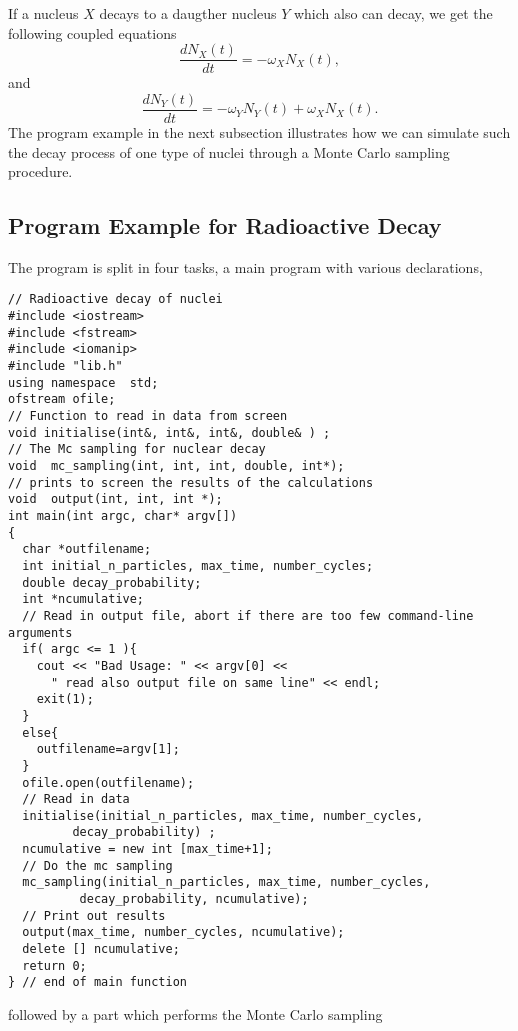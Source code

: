 If a nucleus $X$ decays to a daugther nucleus $Y$ which also can decay, we get
the following coupled equations
\[
   \frac{dN_X(t)}{dt}=-\omega_XN_X(t),
\]
and
\[
   \frac{dN_Y(t)}{dt}=-\omega_YN_Y(t)+\omega_XN_X(t).
\]
The program example in the next subsection illustrates how
we can simulate such the  decay process of one type of nuclei through a Monte Carlo 
sampling procedure.

\subsection{Program Example for Radioactive Decay}
The program is split in four tasks, a main program with various declarations,
\lstset{language=c++}
\begin{lstlisting}[title={\url{http://folk.uio.no/mhjensen/compphys/programs/chapter11/cpp/program3.cpp}}]
// Radioactive decay of nuclei 
#include <iostream>
#include <fstream>
#include <iomanip>
#include "lib.h"
using namespace  std;
ofstream ofile;
// Function to read in data from screen  
void initialise(int&, int&, int&, double& ) ;
// The Mc sampling for nuclear decay 
void  mc_sampling(int, int, int, double, int*);
// prints to screen the results of the calculations 
void  output(int, int, int *);
int main(int argc, char* argv[])
{
  char *outfilename;
  int initial_n_particles, max_time, number_cycles; 
  double decay_probability;
  int *ncumulative;
  // Read in output file, abort if there are too few command-line arguments
  if( argc <= 1 ){
    cout << "Bad Usage: " << argv[0] <<
      " read also output file on same line" << endl;
    exit(1);
  }
  else{
    outfilename=argv[1];
  }
  ofile.open(outfilename);
  // Read in data 
  initialise(initial_n_particles, max_time, number_cycles, 
	     decay_probability) ;
  ncumulative = new int [max_time+1];
  // Do the mc sampling  
  mc_sampling(initial_n_particles, max_time, number_cycles, 
	      decay_probability, ncumulative);
  // Print out results 
  output(max_time, number_cycles, ncumulative);
  delete [] ncumulative;
  return 0; 
} // end of main function
\end{lstlisting}
followed by a  part which performs the Monte Carlo sampling
